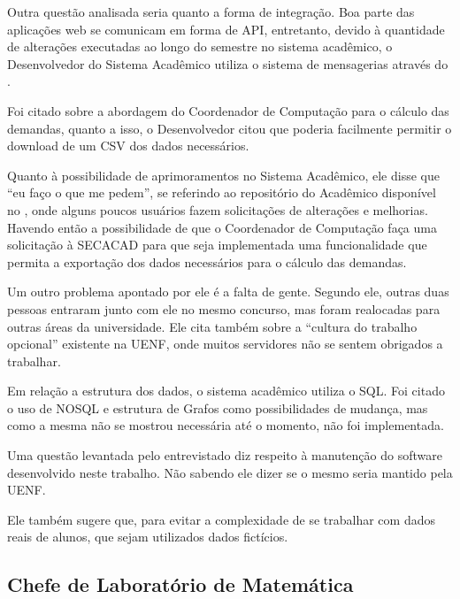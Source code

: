 
Outra questão analisada seria quanto a forma de integração. Boa parte das aplicações web se comunicam em forma de API, entretanto, devido à quantidade de alterações executadas ao longo do semestre no sistema acadêmico, o Desenvolvedor do Sistema Acadêmico utiliza o sistema de mensagerias através do .

Foi citado sobre a abordagem do Coordenador de Computação para o cálculo das demandas, quanto a isso, o Desenvolvedor citou que poderia facilmente permitir o download de um CSV dos dados necessários.

Quanto à possibilidade de aprimoramentos no Sistema Acadêmico, ele disse que ``eu faço o que me pedem'', se referindo ao repositório do Acadêmico disponível no , onde alguns poucos usuários fazem solicitações de alterações e melhorias. Havendo então a possibilidade de que o Coordenador de Computação faça uma solicitação à SECACAD para que seja implementada uma funcionalidade que permita a exportação dos dados necessários para o cálculo das demandas.

Um outro problema apontado por ele é a falta de gente. Segundo ele, outras duas pessoas entraram junto com ele no mesmo concurso, mas foram realocadas para outras áreas da universidade. Ele cita também sobre a ``cultura do trabalho opcional'' existente na UENF, onde muitos servidores não se sentem obrigados a trabalhar.

Em relação a estrutura dos dados, o sistema acadêmico utiliza o SQL. Foi citado o uso de NOSQL e estrutura de Grafos como possibilidades de mudança, mas como a mesma não se mostrou necessária até o momento, não foi implementada.

Uma questão levantada pelo entrevistado diz respeito à manutenção do software desenvolvido neste trabalho. Não sabendo ele dizer se o mesmo seria mantido pela UENF.

Ele também sugere que, para evitar a complexidade de se trabalhar com dados reais de alunos, que sejam utilizados dados fictícios.

\subsection{Chefe de Laboratório de Matemática} %

